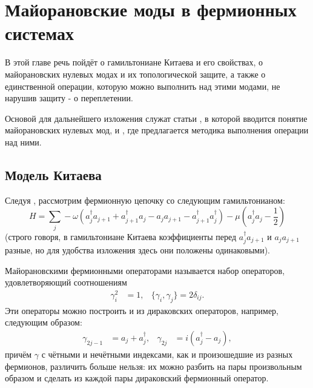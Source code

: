 \documentclass[a4paper,12pt]{article}
\theoremstyle{plain} %
\theoremstyle{definition} %
\theoremstyle{remark} %
\begin{document}

\pagebreak

\section{Майорановские моды в фермионных системах} \label{sec:majorana_modes}

В этой главе речь пойдёт о гамильтониане Китаева и его свойствах, о майорановских нулевых модах и их топологической защите, а также о единственной операции, которую можно выполнить над этими модами, не нарушив защиту - о переплетении.

Основой для дальнейшего изложения служат статьи \cite{kitaev}, в которой вводится понятие майорановских нулевых мод, и \cite{braiding}, где предлагается методика выполнения операции над ними. 

\subsection{Модель Китаева}
Следуя \cite{kitaev}, рассмотрим фермионную цепочку со следующим гамильтонианом:
\begin{equation}
    H = \sum\limits_j -\omega \left( a_j^\dagger a_{j+1} + a_{j+1}^\dagger a_j - a_j a_{j+1} - a_{j+1}^\dagger a_j^\dagger \right) - \mu \left( a_j^\dagger a_j - \frac{1}{2} \right)
    \label{eq:main_hamiltonian_fermi}
\end{equation}
(строго говоря, в гамильтониане Китаева коэффициенты перед $a_j^\dagger a_{j+1}$ и $a_j a_{j+1}$ разные, но для удобства изложения здесь они положены одинаковыми).

Майорановскими фермионными операторами называется набор операторов, удовлетворяющий соотношениям
\begin{align}
\gamma_i^2 &= 1, & \{\gamma_i, \gamma_j\} = 2 \delta_{ij}.
\end{align}
Эти операторы можно построить и из дираковских операторов, например, следующим образом:
\begin{align}
\gamma_{2j-1} &= a_j + a_j^\dagger, & \gamma_{2j} &= i\left( a_j^\dagger - a_j \right),
\end{align}
причём $\gamma$ с чётными и нечётными индексами, как и произошедшие из разных фермионов, различить больше нельзя: их можно разбить на пары произвольным образом и сделать из каждой пары дираковский фермионный оператор.
\end{document}
